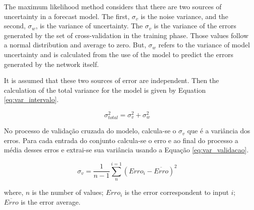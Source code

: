 The maximum likelihood method considers that there are two sources of uncertainty in a forecast model. The first, $\sigma_v$ is the noise variance, and the second, $\sigma_w$, is the variance of uncertainty. The $\sigma_v$ is the variance of the errors generated by the set of cross-validation in the training phase. Those values follow a normal distribution and average to zero. But, $\sigma_w$ refers to the variance of model uncertainty and is calculated from the use of the model to predict the errors generated by the network itself.

It is assumed that these two sources of error are independent. Then the calculation of the total variance for the model is given by Equation \ref{eq:var_intervalo}.

\begin{equation}
\label{eq:var_intervalo}
\sigma^{2}_{total} = \sigma^{2}_{v} + \sigma^{2}_{w}
\end{equation}

No processo de validação cruzada do modelo, calcula-se o $\sigma_v$ que é a variância dos erros. Para cada entrada do conjunto calcula-se o erro e ao final do processo a média desses erros e extrai-se sua variância usando a Equação \ref{eq:var_validacao}.

\begin{equation}
\label{eq:var_validacao}
\sigma_v = \frac{1}{n-1} \sum_{n}^{i=1} (Erro_i - \overline{Erro})^2
\end{equation}

where, $n$ is the number of values; $Erro_i$ is the error correspondent to input $i$; $\overline{Erro}$ is the error average.


